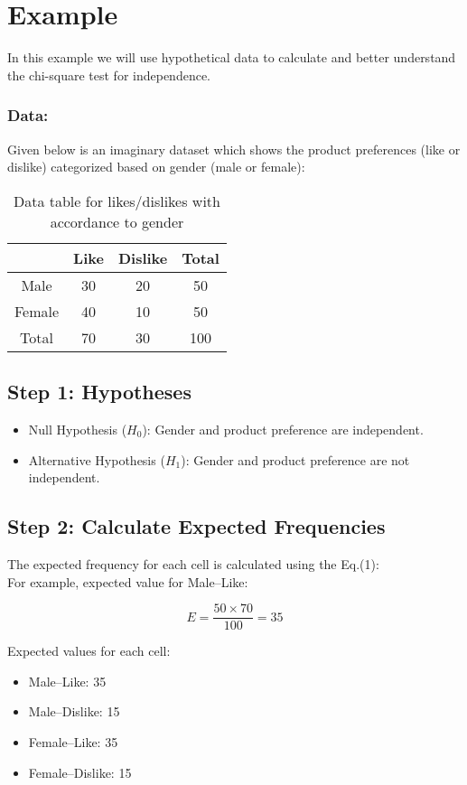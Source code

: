 \documentclass[12pt]{article}
\begin{document}
\section{Example}
In this example we will use hypothetical data to calculate and better understand the chi-square test for independence.

\subsubsection*{Data:}
Given below is an imaginary dataset which shows the product preferences (like or dislike) categorized based on gender (male or female):

\begin{table}[h]
\centering
\begin{tabular}{|c|c|c|c|}
  \hline
  & Like & Dislike & Total \\
  \hline
  Male   & 30   & 20   & 50 \\
  Female & 40   & 10   & 50 \\
  \hline
  Total  & 70   & 30   & 100 \\
  \hline
\end{tabular}
\caption{Data table for likes/dislikes with accordance to gender}
\end{table}

\subsection*{Step 1: Hypotheses}
\begin{itemize}
    \item Null Hypothesis ($H_0$): Gender and product preference are independent.
    \item Alternative Hypothesis ($H_1$): Gender and product preference are not independent.
\end{itemize}

\subsection*{Step 2: Calculate Expected Frequencies}
The expected frequency for each cell is calculated using the Eq.(1):\\[4pt]

For example, expected value for Male–Like:

\[
E = \frac{50 \times 70}{100} = 35
\]

Expected values for each cell:
\begin{itemize}
    \item Male–Like: 35
    \item Male–Dislike: 15
    \item Female–Like: 35
    \item Female–Dislike: 15
\end{itemize}
\end{document}
